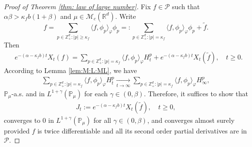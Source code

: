\documentclass[12pt,a4paper]{amsart}
\theoremstyle{plain}
\theoremstyle{definition}
\numberwithin{equation}{section}
\begin{document}
\begin{proof}[Proof of Theorem \ref{thm: law of large number}]
	Fix $f \in \mathcal P$ such that $\alpha \beta > \kappa_f b (1+\beta)$ and $\mu \in \mathcal M_c(\mathbb R^d)$.
	Write
  \[
    f
    = \sum_{p\in \mathbb Z_+^d:|p|\geq \kappa_f}\langle f,\phi_p\rangle_\varphi \phi_p
    =: \sum_{p\in \mathbb Z_+^d:|p|= \kappa_f}\langle f,\phi_p\rangle_\varphi \phi_p+\widetilde{f}.
  \]
	Then
  \begin{align}
    & e^{-(\alpha-\kappa_fb)t}X_t(f)=
      \sum_{p\in \mathbb Z_+^d:|p|= \kappa_f}\langle f,\phi_p\rangle_\varphi H_t^p+e^{-(\alpha-\kappa_fb)t} X_t(\widetilde{f}),
      \quad t\geq 0.
  \end{align}
	According to Lemma \ref{lem:M:L:ML}, we have
  \begin{align}
    \label{as convergence}
    \sum_{p\in \mathbb{Z}_+^d:|p|= \kappa_f}\langle f,\phi_p\rangle_\varphi H_t^p
    \xrightarrow[t\to \infty]{} \sum_{p\in \mathbb{Z}_+^d:|p|=\kappa_f}\langle f, \phi_p\rangle_{\varphi} H_{\infty}^p,
  \end{align}
  $\mathbb{P}_{\mu}$-a.s. and in $L^{1+\gamma}(\mathbb{P}_{\mu})$ for each $\gamma\in(0,\beta)$.
  Therefore, it suffices to show that
  \begin{align}
    J_t
    :=e^{-(\alpha-\kappa_fb)t}X_t( \widetilde{f}),
    \quad t\geq 0,
  \end{align}
  converges to $0$ in $L^{1+\gamma}(\mathbb{P}_{\mu})$ for all $\gamma\in(0,\beta)$, and converges almost surely provided $f$ is twice differentiable and all its second order partial derivatives are in $\mathcal{P}$.


\end{proof}
\end{document}
